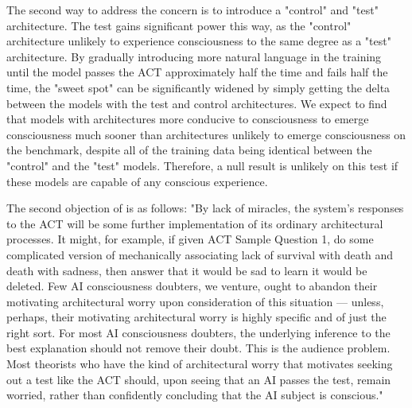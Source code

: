 \documentclass{article}
\begin{document}
The second way to address the concern is to introduce a "control" and "test" architecture. The test gains significant power this way, as the "control" architecture unlikely to experience consciousness to the same degree as a "test" architecture. By gradually introducing more natural language in the training until the model passes the ACT approximately half the time and fails half the time, the "sweet spot" can be significantly widened by simply getting the delta between the models with the test and control architectures. We expect to find that models with architectures more conducive to consciousness to emerge consciousness much sooner than  architectures unlikely to emerge consciousness on the benchmark, despite all of the training data being identical between the "control" and the "test" models. Therefore, a null result is unlikely on this test if these models are capable of any conscious experience.

The second objection of \citep{udell2021schneider} is as follows: "By lack of miracles, the system’s responses to the ACT will be some further implementation of its ordinary architectural processes.  It might, for example, if given ACT Sample Question 1, do some complicated version of mechanically associating lack of survival with death and death with sadness, then answer that it would be sad to learn it would be deleted.  Few AI consciousness doubters, we venture, ought to abandon their motivating architectural worry upon consideration of this situation — unless, perhaps, their motivating architectural worry is highly specific and of just the right sort.  For most AI consciousness doubters, the underlying inference to the best explanation should not remove their doubt.  This is the audience problem.  Most theorists who have the kind of architectural worry that motivates seeking out a test like the ACT should, upon seeing that an AI passes the test, remain worried, rather than confidently concluding that the AI subject is conscious."
\end{document}
